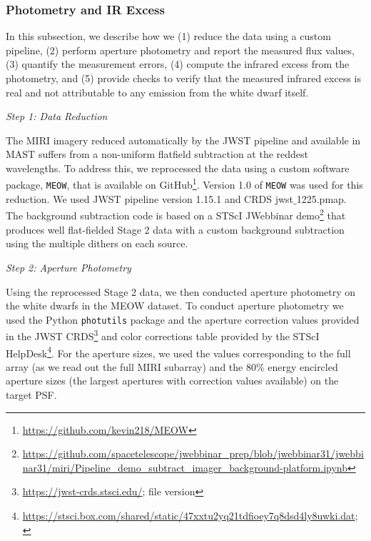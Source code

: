 \documentclass[twocolumn]{aastex631}
\begin{document}
\subsubsection{Photometry and IR Excess}
In this subsection, we describe how we (1) reduce the data using a custom pipeline, (2) perform aperture photometry and report the measured flux values, (3) quantify the measurement errors, (4) compute the infrared excess from the photometry, and (5) provide checks to verify that the measured infrared excess is real and not attributable to any emission from the white dwarf itself.

\begin{center}
    \vspace{-1mm}
    {\it Step 1: Data Reduction}
    \vspace{-2mm}
\end{center}
The MIRI imagery reduced automatically by the JWST pipeline and available in MAST suffers from a non-uniform flatfield subtraction at the reddest wavelengths.  {To address this, we reprocessed the data using a custom software package, \texttt{MEOW}, that is available on GitHub\footnote{\url{https://github.com/kevin218/MEOW}}. Version 1.0 of \texttt{MEOW} was used for this reduction.  We used JWST pipeline version 1.15.1 and CRDS jwst$\_$1225.pmap.} The background subtraction code is based on a STScI JWebbinar demo\footnote{\url{https://github.com/spacetelescope/jwebbinar_prep/blob/jwebbinar31/jwebbinar31/miri/Pipeline_demo_subtract_imager_background-platform.ipynb}} that produces well flat-fielded Stage 2 data with a custom background subtraction using the multiple dithers on each source. 

\begin{center}
    \vspace{-1mm}
    {\it Step 2: Aperture Photometry}
    \vspace{-2mm}
\end{center}
Using the reprocessed Stage 2 data, we then conducted aperture photometry on the white dwarfs in the MEOW dataset. To conduct aperture photometry we used the Python \texttt{photutils} package and the aperture correction values provided in the JWST CRDS\footnote{\url{https://jwst-crds.stsci.edu/}; file version } and color corrections table provided by the STScI HelpDesk\footnote{\url{https://stsci.box.com/shared/static/47xxtu2yq21tdfioey7q8dsd4ly8uwki.dat}; }. For the aperture sizes, we used the values corresponding to the full array (as we read out the full MIRI subarray) and the 80\% energy encircled aperture sizes (the largest apertures with correction values available) on the target PSF. 
\end{document}
